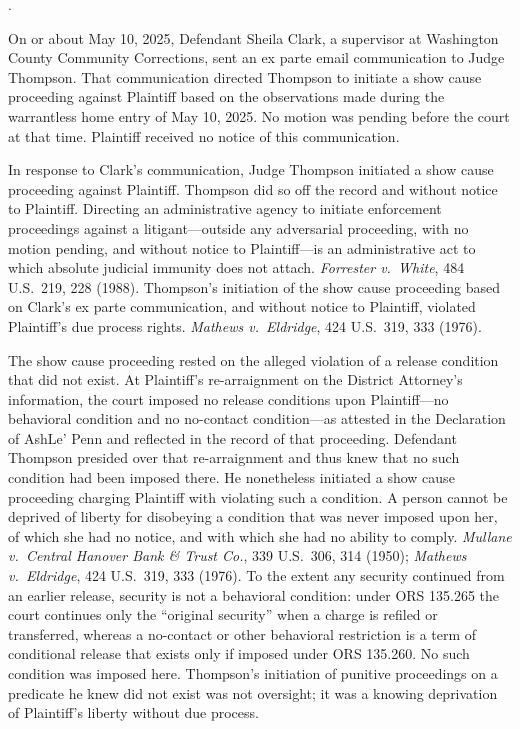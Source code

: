 \documentclass[12pt,letterpaper]{article}
\newcounter{complaintpara}
\newenvironment{paras}{%
	\begin{list}{\arabic{complaintpara}.}{%
			\setlength{\leftmargin}{0.5in}%
			\setlength{\labelwidth}{0.4in}%
			\setlength{\labelsep}{0.1in}%
			\setlength{\itemsep}{0pt}%
			\setlength{\parsep}{0pt}%
			\setlength{\topsep}{6pt}%
		}%
	}{%
	\end{list}%
}
\begin{document}
	\begin{paras}
		
		\item\label{fact:clarkexpart} On or about May 10, 2025,
		Defendant Sheila Clark, a supervisor at Washington County
		Community Corrections, sent an ex parte email communication to
		Judge Thompson. That communication directed Thompson to
		initiate a show cause proceeding against Plaintiff based on
		the observations made during the warrantless home entry of
		May 10, 2025. No motion was pending before the court at that
		time. Plaintiff received no notice of this communication.
		
		\item\label{fact:thompsonexpart} In response to Clark's
		communication, Judge Thompson initiated a show cause
		proceeding against Plaintiff. Thompson did so off the record
		and without notice to Plaintiff. Directing an administrative
		agency to initiate enforcement proceedings against a
		litigant---outside any adversarial proceeding, with no motion
		pending, and without notice to Plaintiff---is an
		administrative act to which absolute judicial immunity does
		not attach. \textit{Forrester v.\ White}, 484 U.S.\ 219,
		228 (1988). Thompson's initiation of the show cause
		proceeding based on Clark's ex parte communication, and
		without notice to Plaintiff, violated Plaintiff's due process
		rights. \textit{Mathews v.\ Eldridge}, 424 U.S.\ 319,
		333 (1976).
		
		\item\label{fact:noconditions} The show cause proceeding rested on the alleged violation of a release condition that did not exist. At Plaintiff's re-arraignment on the District Attorney's information, the court imposed no release conditions upon Plaintiff---no behavioral condition and no no-contact condition---as attested in the Declaration of AshLe' Penn and reflected in the record of that proceeding. Defendant Thompson presided over that re-arraignment and thus knew that no such condition had been imposed there. He nonetheless initiated a show cause proceeding charging Plaintiff with violating such a condition. A person cannot be deprived of liberty for disobeying a condition that was never imposed upon her, of which she had no notice, and with which she had no ability to comply. \textit{Mullane v.\ Central Hanover Bank \& Trust Co.}, 339 U.S.\ 306, 314 (1950); \textit{Mathews v.\ Eldridge}, 424 U.S.\ 319, 333 (1976). To the extent any security continued from an earlier release, security is not a behavioral condition: under ORS 135.265 the court continues only the ``original security'' when a charge is refiled or transferred, whereas a no-contact or other behavioral restriction is a term of conditional release that exists only if imposed under ORS 135.260. No such condition was imposed here. Thompson's initiation of punitive proceedings on a predicate he knew did not exist was not oversight; it was a knowing deprivation of Plaintiff's liberty without due process.


\end{paras}
\end{document}
